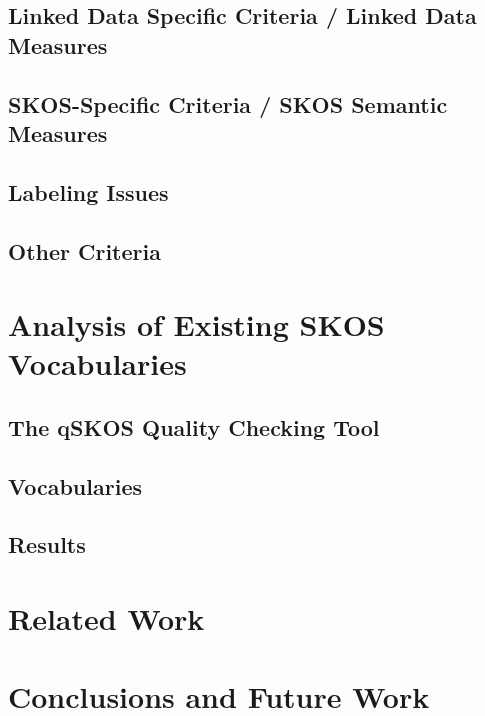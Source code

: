\documentclass{llncs}
\begin{document}
\subsection{Linked Data Specific Criteria / Linked Data Measures}

\subsection{SKOS-Specific Criteria / SKOS Semantic Measures}

\subsection{Labeling Issues}

\subsection{Other Criteria}

\section{Analysis of Existing SKOS Vocabularies}

\subsection{The qSKOS Quality Checking Tool}

\subsection{Vocabularies}

\subsection{Results}

\section{Related Work}

\section{Conclusions and Future Work}



\end{document}
